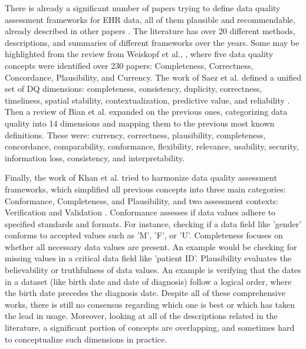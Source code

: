
There is already a significant number of papers trying to define data quality assessment frameworks for EHR data, all of them plausible and recommendable, already described in other papers \cite{bianAssessingPracticeData2020}. The literature has over 20 different methods, descriptions, and summaries of different frameworks over the years. Some may be highlighted from the review from Weiskopf et al., \cite{weiskopfMethodsDimensionsElectronic2013}, where five data quality concepts were identified over 230 papers: Completeness, Correctness, Concordance, Plausibility, and Currency. 
The work of Saez et al. defined a unified set of DQ dimensions: completeness, consistency, duplicity, correctness, timeliness, spatial stability, contextualization, predictive value, and reliability \cite{saezOrganizingDataQuality2012}. Then a review of Bian et al. \cite{bianAssessingPracticeData2020} expanded on the previous ones, categorizing data quality into 14 dimensions and mapping them to the previous most known definitions. These were: currency, correctness, plausibility, completeness, concordance, comparability, conformance, flexibility, relevance, usability, security, information loss, consistency, and interpretability.

Finally, the work of Khan et al. tried to harmonize data quality assessment frameworks, which simplified all previous concepts into three main categories: Conformance, Completeness, and Plausibility, and two assessment contexts: Verification and Validation \cite{kahnHarmonizedDataQuality2016a}. Conformance  assesses if data values adhere to specified standards and formats. For instance, checking if a data field like 'gender' conforms to accepted values such as 'M', 'F', or 'U'. Completeness focuses on whether all necessary data values are present. An example would be checking for missing values in a critical data field like 'patient ID'. Plausibility evaluates the believability or truthfulness of data values. An example is verifying that the dates in a dataset (like birth date and date of diagnosis) follow a logical order, where the birth date precedes the diagnosis date. Despite all of these comprehensive works, there is still no consensus regarding which one is best or which has taken the lead in usage. Moreover, looking at all of the descriptions related in the literature, a significant portion of concepts are overlapping, and sometimes hard to conceptualize such dimensions in practice.


